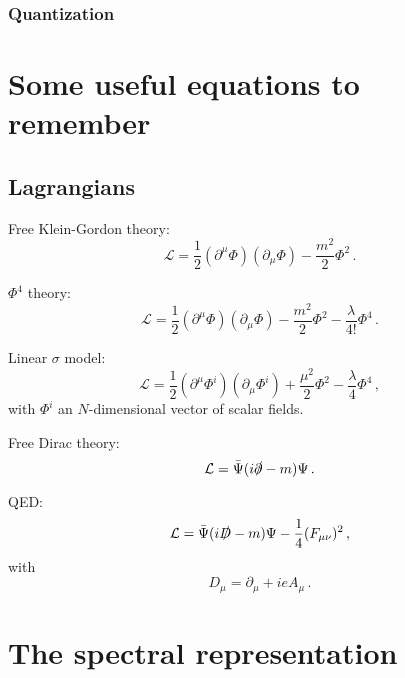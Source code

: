 \documentclass[12pt]{memoir}
\begin{document}
\subsection{Quantization}


\begin{appendices}
  \chapter{Some useful equations to remember}

  \section{Lagrangians}

  Free Klein-Gordon theory:
  \begin{equation}\label{eq:kg_free}
    \mathcal{L} = \frac{1}{2}(\partial^{\mu} \Phi)(\partial_{\mu} \Phi) - \frac{m^2}{2} \Phi^2\,.
  \end{equation}

  $\Phi^4$ theory:
  \begin{equation}\label{eq:phi4}
    \mathcal{L} = \frac{1}{2}(\partial^{\mu} \Phi)(\partial_{\mu} \Phi) - \frac{m^2}{2} \Phi^2 - \frac{\lambda}{4!} \Phi^4\,.
  \end{equation}

  Linear $\sigma$ model:
  \begin{equation}\label{eq:linear_sigma_model}
    \mathcal{L} = \frac{1}{2}(\partial^{\mu} \Phi^i)(\partial_{\mu} \Phi^i) + \frac{\mu^2}{2} \Phi^2 - \frac{\lambda}{4} \Phi^4\,,
  \end{equation}
  with $\Phi^i$ an $N$-dimensional vector of scalar fields.

  Free Dirac theory:
  \begin{equation}\label{eq:dirac_free}
    \mathcal{L} = \bar{\Psi}(i\slashed{\partial} - m)\Psi\,.
  \end{equation}

  QED:
  \begin{equation}\label{eq:qed}
    \mathcal{L} = \bar{\Psi}(i\slashed{D} - m)\Psi - \frac{1}{4}(F_{\mu\nu})^2 \,,
  \end{equation}
  with
  \begin{equation}\label{eq:qed_cov_deriv}
    D_{\mu} = \partial_{\mu} + i e A_{\mu}\,.
  \end{equation}

  \chapter{The spectral representation}

\end{appendices}

\backmatter{}

% 
\end{document}
